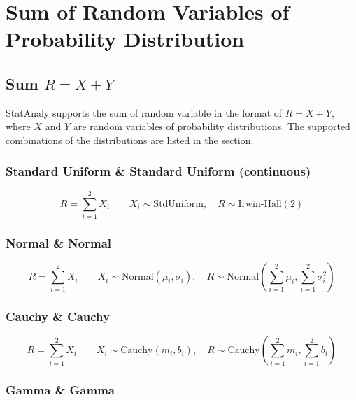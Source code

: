 \chapter{Sum of Random Variables of Probability Distribution}
\label{ch:sum_rv}


\section{Sum $R = X + Y$}

StatAnaly supports the sum of random variable in the format of $R = X + Y$, where $X$ and $Y$ are random variables of probability distributions.
The supported combinations of the distributions are listed in the section.

\subsection{Standard Uniform \& Standard Uniform (continuous)}
    \begin{equation}
        R = \sum_{i=1}^2 X_i \qquad 
        X_i \sim \text{StdUniform}, \quad 
        R \sim \text{Irwin-Hall}(2)
    \end{equation}

\subsection{Normal \& Normal}

    \begin{equation}
        R = \sum_{i=1}^2 X_i \qquad 
        X_i \sim \text{Normal}(\mu_i,\sigma_i), \quad 
        R \sim \text{Normal}\left(\sum _{i=1}^{2}\mu _{i},\sum _{i=1}^{2}\sigma _{i}^{2}\right)
    \end{equation}

\subsection{Cauchy \& Cauchy}

    \begin{equation}
        R = \sum_{i=1}^2 X_i \qquad 
        X_i \sim \text{Cauchy}(m_i,b_i), \quad 
        R \sim \text{Cauchy}\left(\sum _{i=1}^{2}m_{i},\sum _{i=1}^{2}b _{i}\right)
    \end{equation}

\subsection{Gamma \& Gamma}

